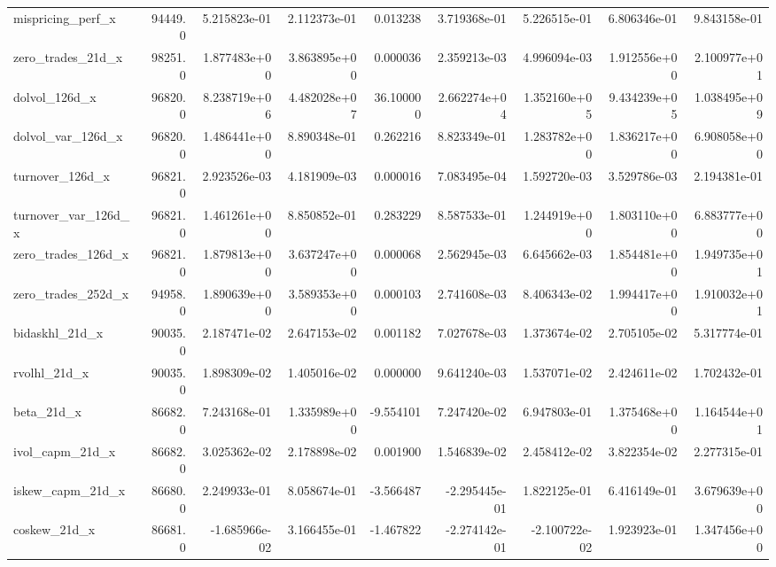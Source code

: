 \documentclass[10pt]{article}
\begin{document}
\begin{landscape}
\begin{longtable}{lrrrrrrrr}
mispricing\_perf\_x       &   94449.0 &  5.215823e-01 &  2.112373e-01 &      0.013238 &  3.719368e-01 &  5.226515e-01 &  6.806346e-01 &  9.843158e-01 \\
zero\_trades\_21d\_x       &   98251.0 &  1.877483e+00 &  3.863895e+00 &      0.000036 &  2.359213e-03 &  4.996094e-03 &  1.912556e+00 &  2.100977e+01 \\
dolvol\_126d\_x           &   96820.0 &  8.238719e+06 &  4.482028e+07 &     36.100000 &  2.662274e+04 &  1.352160e+05 &  9.434239e+05 &  1.038495e+09 \\
dolvol\_var\_126d\_x       &   96820.0 &  1.486441e+00 &  8.890348e-01 &      0.262216 &  8.823349e-01 &  1.283782e+00 &  1.836217e+00 &  6.908058e+00 \\
turnover\_126d\_x         &   96821.0 &  2.923526e-03 &  4.181909e-03 &      0.000016 &  7.083495e-04 &  1.592720e-03 &  3.529786e-03 &  2.194381e-01 \\
turnover\_var\_126d\_x     &   96821.0 &  1.461261e+00 &  8.850852e-01 &      0.283229 &  8.587533e-01 &  1.244919e+00 &  1.803110e+00 &  6.883777e+00 \\
zero\_trades\_126d\_x      &   96821.0 &  1.879813e+00 &  3.637247e+00 &      0.000068 &  2.562945e-03 &  6.645662e-03 &  1.854481e+00 &  1.949735e+01 \\
zero\_trades\_252d\_x      &   94958.0 &  1.890639e+00 &  3.589353e+00 &      0.000103 &  2.741608e-03 &  8.406343e-02 &  1.994417e+00 &  1.910032e+01 \\
bidaskhl\_21d\_x          &   90035.0 &  2.187471e-02 &  2.647153e-02 &      0.001182 &  7.027678e-03 &  1.373674e-02 &  2.705105e-02 &  5.317774e-01 \\
rvolhl\_21d\_x            &   90035.0 &  1.898309e-02 &  1.405016e-02 &      0.000000 &  9.641240e-03 &  1.537071e-02 &  2.424611e-02 &  1.702432e-01 \\
beta\_21d\_x              &   86682.0 &  7.243168e-01 &  1.335989e+00 &     -9.554101 &  7.247420e-02 &  6.947803e-01 &  1.375468e+00 &  1.164544e+01 \\
ivol\_capm\_21d\_x         &   86682.0 &  3.025362e-02 &  2.178898e-02 &      0.001900 &  1.546839e-02 &  2.458412e-02 &  3.822354e-02 &  2.277315e-01 \\
iskew\_capm\_21d\_x        &   86680.0 &  2.249933e-01 &  8.058674e-01 &     -3.566487 & -2.295445e-01 &  1.822125e-01 &  6.416149e-01 &  3.679639e+00 \\
coskew\_21d\_x            &   86681.0 & -1.685966e-02 &  3.166455e-01 &     -1.467822 & -2.274142e-01 & -2.100722e-02 &  1.923923e-01 &  1.347456e+00 \\

\end{longtable}
\end{landscape}
\end{document}
